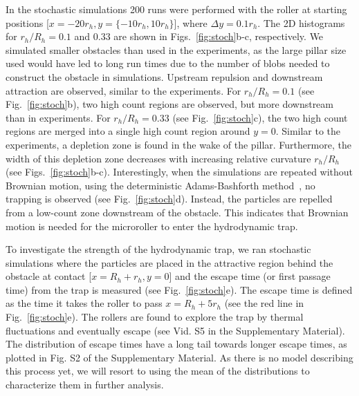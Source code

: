 \documentclass[12pt]{article}
\begin{document}
In the stochastic simulations 200 runs were performed with the roller at starting positions [$x=-20r_h,y=\{-10r_h,10r_h\}$], where $\Delta y = 0.1r_h$. The 2D histograms for $r_h/R_h=0.1$ and $0.33$ are shown in
Figs.~\ref{fig:stoch}b-c, respectively. We simulated smaller obstacles than used in the experiments, as the large pillar size used would have led to  long run times due to the number of blobs needed to construct the obstacle in simulations.
Upstream repulsion and downstream attraction are observed, similar to the experiments. 
For $r_h/R_h=0.1$ (see Fig.~\ref{fig:stoch}b), two high count regions are observed, but more downstream than in experiments. For $r_h/R_h=0.33$ (see Fig.~\ref{fig:stoch}c), the two high count regions are merged into a single high count region around $y=0$. 
Similar to the experiments, a depletion zone is found in the wake of the pillar. Furthermore, the width of this depletion zone decreases with increasing relative curvature $r_h/R_h$ (see Figs.~\ref{fig:stoch}b-c).  Interestingly, when the simulations are repeated without Brownian motion, using the deterministic Adams-Bashforth method~\cite{balboa2017brownian}, no trapping is observed (see Fig.~\ref{fig:stoch}d).  Instead, the particles are repelled from a low-count zone downstream of the obstacle. This indicates that Brownian motion is needed for the microroller to enter the hydrodynamic trap. 

To investigate the strength of the hydrodynamic trap, we ran stochastic simulations where the particles are placed in the attractive region behind the obstacle at contact [$x=R_h+r_h,y=0$] and the escape time (or first passage time) from the trap is measured (see
Fig.~\ref{fig:stoch}e)\cite{escape}. The escape time is defined as the time it takes the roller to pass $x = R_h + 5r_h$\cite{criterion} (see the red line in
Fig.~\ref{fig:stoch}e). %
The rollers are found to explore the trap by thermal fluctuations and eventually escape (see Vid. S5 in the Supplementary Material).
 The distribution of escape times have a long tail towards longer escape times, as plotted in Fig. S2 of the Supplementary Material. As there is no model describing this process yet, we will resort to using the mean of the distributions to characterize them in further analysis. 
\end{document}
